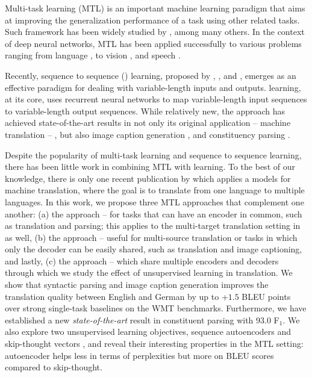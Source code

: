 Multi-task learning (MTL) is an important machine learning paradigm that
aims at improving the generalization performance of a task using other related
tasks. 
Such framework has been widely studied by
\citet{thrun96,caruana97,evgeniou04,ando05,argyriou07,kumar12}, among many
others. In the context of deep neural networks, MTL has
been applied successfully to various problems ranging from language
\citep{liu15}, to vision
\citep{donahue14},
and speech \citep{heigold13,huang2013cross}.

Recently, sequence to sequence (\ssl{}) learning, proposed by
\citet{kal13}, \citet{sutskever14}, and \citet{cho14}, emerges as an effective paradigm for dealing with
variable-length inputs and outputs. \ssl{} learning, at its core, uses
recurrent neural networks to map variable-length input sequences to
variable-length output sequences.  While relatively new, the \ssl{}
approach has achieved state-of-the-art results in not only its original
application -- machine translation --
\citep{luong15,jean15,luong15attn,jean15wmt,luong15iwslt}, but also image caption generation \citep{vinyals15caption},
and constituency parsing \citep{vinyals15grammar}. 

Despite the popularity of multi-task learning and sequence to sequence
learning, there has been little work in combining MTL with \ssl{}
learning. To the best of our knowledge, there is only one recent
publication by \citet{dong15} which applies a \ssl{} models for machine
translation, where the goal is to translate from one language to
multiple languages.
In this work, we propose three MTL
approaches that complement one another: (a) the {\it \otm} approach -- for
tasks that can have an encoder in common, such as translation and parsing; this 
applies to the multi-target translation setting in \citep{dong15} as well, (b)
the {\it \mto} approach -- useful for multi-source
translation or tasks in which only the decoder can be easily shared,
such as translation and image captioning, and lastly, (c) the {\it \mtm} approach -- which share
multiple encoders and decoders through which we study the effect of unsupervised
learning in translation.
We show
that syntactic parsing and image caption generation improves the
translation quality between English and German by up to +$1.5$ BLEU points over
strong single-task baselines on the WMT benchmarks. 
Furthermore, we have established a new {\it state-of-the-art} result in
constituent parsing with 93.0 F$_1$.
We also explore two unsupervised learning
objectives, sequence autoencoders \citep{dai15} and skip-thought vectors
\citep{kiros15skip}, and reveal their interesting properties in the MTL setting: autoencoder helps less in terms of
  perplexities but more on BLEU scores compared to skip-thought.
